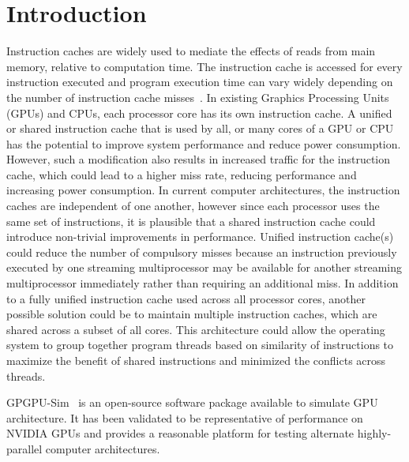\section{Introduction}


Instruction caches are widely used to mediate the effects of reads from main memory, relative to computation time. 
The instruction cache is accessed for every instruction executed and program execution time can vary widely depending on the number of instruction cache misses~\cite{arnold94}. 
In existing Graphics Processing Units (GPUs) and CPUs, each processor core has its own instruction cache. 
A unified or shared instruction cache that is used by all, or many cores of a GPU or CPU has the potential to improve system performance and reduce power consumption.
However, such a modification also results in increased traffic for the instruction cache, which could lead to a higher miss rate, reducing performance and increasing power consumption. 
In current computer architectures, the instruction caches are independent of one another, however since each processor uses the same set of instructions, it is plausible that a shared instruction cache could introduce non-trivial improvements in performance. 
Unified instruction cache(s) could reduce the number of compulsory misses because an instruction previously executed by one streaming multiprocessor may be available for another streaming multiprocessor immediately rather than requiring an additional miss. 
In addition to a fully unified instruction cache used across all processor cores, another possible solution could be to maintain multiple instruction caches, which are shared across a subset of all cores. 
This architecture could allow the operating system to group together program threads based on similarity of instructions to maximize the benefit of shared instructions and minimized the conflicts across threads. 

GPGPU-Sim~\cite{bakhodayuan09} is an open-source software package available to simulate GPU architecture. 
It has been validated to be representative of performance on NVIDIA GPUs and provides a reasonable platform for testing alternate highly-parallel computer architectures.
